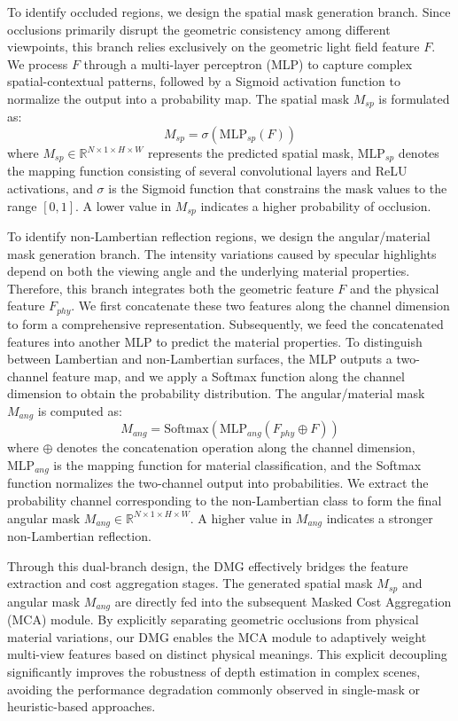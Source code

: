 To identify occluded regions, we design the spatial mask generation branch. Since occlusions primarily disrupt the geometric consistency among different viewpoints, this branch relies exclusively on the geometric light field feature $F$. We process $F$ through a multi-layer perceptron (MLP) to capture complex spatial-contextual patterns, followed by a Sigmoid activation function to normalize the output into a probability map. The spatial mask $M_{sp}$ is formulated as:
\begin{equation}
\label{eq:eq32}
M_{sp} = \sigma(\text{MLP}_{sp}(F))
\end{equation}
where $M_{sp} \in \mathbb{R}^{N \times 1 \times H \times W}$ represents the predicted spatial mask, $\text{MLP}_{sp}$ denotes the mapping function consisting of several convolutional layers and ReLU activations, and $\sigma$ is the Sigmoid function that constrains the mask values to the range $[0, 1]$. A lower value in $M_{sp}$ indicates a higher probability of occlusion.

To identify non-Lambertian reflection regions, we design the angular/material mask generation branch. The intensity variations caused by specular highlights depend on both the viewing angle and the underlying material properties. Therefore, this branch integrates both the geometric feature $F$ and the physical feature $F_{phy}$. We first concatenate these two features along the channel dimension to form a comprehensive representation. Subsequently, we feed the concatenated features into another MLP to predict the material properties. To distinguish between Lambertian and non-Lambertian surfaces, the MLP outputs a two-channel feature map, and we apply a Softmax function along the channel dimension to obtain the probability distribution. The angular/material mask $M_{ang}$ is computed as:
\begin{equation}
\label{eq:eq33}
M_{ang} = \text{Softmax}(\text{MLP}_{ang}(F_{phy} \oplus F))
\end{equation}
where $\oplus$ denotes the concatenation operation along the channel dimension, $\text{MLP}_{ang}$ is the mapping function for material classification, and the Softmax function normalizes the two-channel output into probabilities. We extract the probability channel corresponding to the non-Lambertian class to form the final angular mask $M_{ang} \in \mathbb{R}^{N \times 1 \times H \times W}$. A higher value in $M_{ang}$ indicates a stronger non-Lambertian reflection.

Through this dual-branch design, the DMG effectively bridges the feature extraction and cost aggregation stages. The generated spatial mask $M_{sp}$ and angular mask $M_{ang}$ are directly fed into the subsequent Masked Cost Aggregation (MCA) module. By explicitly separating geometric occlusions from physical material variations, our DMG enables the MCA module to adaptively weight multi-view features based on distinct physical meanings. This explicit decoupling significantly improves the robustness of depth estimation in complex scenes, avoiding the performance degradation commonly observed in single-mask or heuristic-based approaches.

